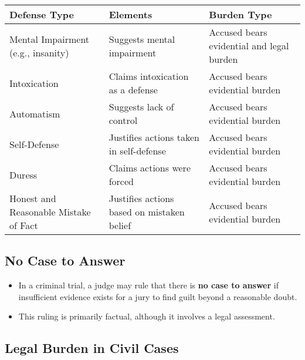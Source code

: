 \begin{longtable}[]{@{}
  >{\raggedright\arraybackslash}p{}
  >{\raggedright\arraybackslash}p{}
  >{\raggedright\arraybackslash}p{}@{}}
\toprule\noalign{}
\begin{minipage}[b]{\linewidth}\raggedright
Defense Type
\end{minipage} & \begin{minipage}[b]{\linewidth}\raggedright
Elements
\end{minipage} & \begin{minipage}[b]{\linewidth}\raggedright
Burden Type
\end{minipage} \\
\midrule\noalign{}
\endhead
\bottomrule\noalign{}
\endlastfoot
Mental Impairment (e.g., insanity) & Suggests mental impairment &
Accused bears evidential and legal burden \\
Intoxication & Claims intoxication as a defense & Accused bears
evidential burden \\
Automatism & Suggests lack of control & Accused bears evidential
burden \\
Self-Defense & Justifies actions taken in self-defense & Accused bears
evidential burden \\
Duress & Claims actions were forced & Accused bears evidential burden \\
Honest and Reasonable Mistake of Fact & Justifies actions based on
mistaken belief & Accused bears evidential burden \\
\end{longtable}

\subsection{ No Case to Answer}\label{no-case-to-answer}

\begin{itemize}
\tightlist
\item
  In a criminal trial, a judge may rule that there is \textbf{no case to
  answer} if insufficient evidence exists for a jury to find guilt
  beyond a reasonable doubt.
\item
  This ruling is primarily factual, although it involves a legal
  assessment.
\end{itemize}

\subsection{Legal Burden in Civil
Cases}\label{legal-burden-in-civil-cases}

